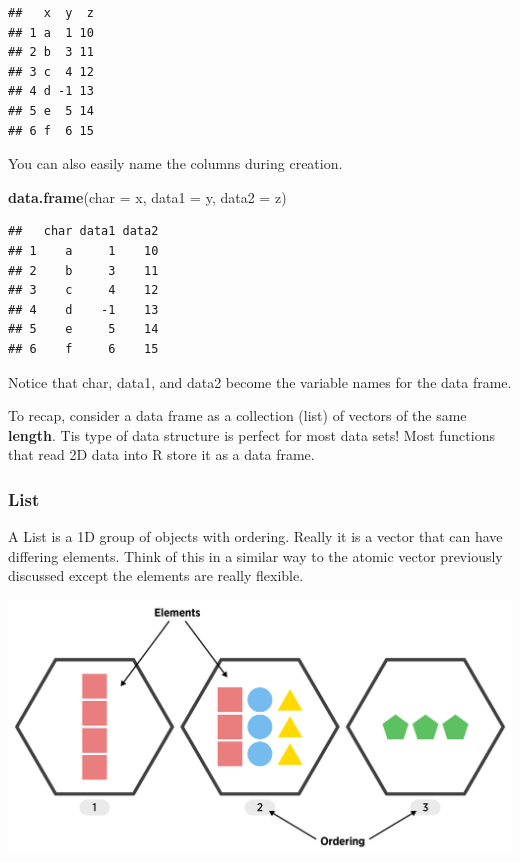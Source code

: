 \documentclass[
]{book}
\newenvironment{Shaded}{\begin{snugshade}}{\end{snugshade}}
\newcommand{\DataTypeTok}[1]{\textcolor[rgb]{0.13,0.29,0.53}{#1}}
\newcommand{\KeywordTok}[1]{\textcolor[rgb]{0.13,0.29,0.53}{\textbf{#1}}}
\newcommand{\NormalTok}[1]{#1}
\theoremstyle{definition}
\theoremstyle{definition}
\theoremstyle{definition}
\theoremstyle{remark}
\begin{document}
\begin{verbatim}
##   x  y  z
## 1 a  1 10
## 2 b  3 11
## 3 c  4 12
## 4 d -1 13
## 5 e  5 14
## 6 f  6 15
\end{verbatim}

You can also easily name the columns during creation.

\begin{Shaded}
\begin{Highlighting}[]
\KeywordTok{data.frame}\NormalTok{(}\DataTypeTok{char =}\NormalTok{ x, }\DataTypeTok{data1 =}\NormalTok{ y, }\DataTypeTok{data2 =}\NormalTok{ z)}
\end{Highlighting}
\end{Shaded}

\begin{verbatim}
##   char data1 data2
## 1    a     1    10
## 2    b     3    11
## 3    c     4    12
## 4    d    -1    13
## 5    e     5    14
## 6    f     6    15
\end{verbatim}

Notice that char, data1, and data2 become the variable names for the data frame.

To recap, consider a data frame as a collection (list) of vectors of the same \textbf{length}. Tis type of data structure is perfect for most data sets! Most functions that read 2D data into R store it as a data frame.

\hypertarget{list}{%
\subsubsection{List}\label{list}}

A List is a 1D group of objects with ordering. Really it is a vector that can have differing elements. Think of this in a similar way to the atomic vector previously discussed except the elements are really flexible.

\begin{center}\includegraphics[width=0.8\linewidth]{img/listVisualF} \end{center}
\end{document}
